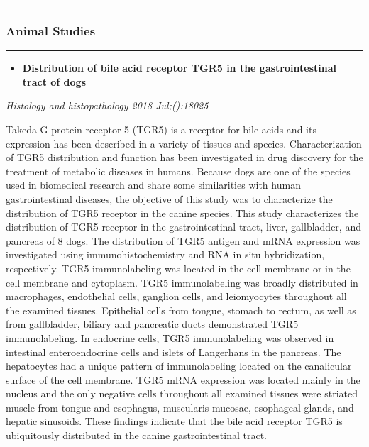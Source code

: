 \documentclass[]{article}
\providecommand{\tightlist}{%
  \setlength{\itemsep}{0pt}\setlength{\parskip}{0pt}}
\begin{document}
{}

{}

\begin{center}\rule{0.5\linewidth}{\linethickness}\end{center}

\hypertarget{animal-studies}{%
\subsubsection{Animal Studies}\label{animal-studies}}

\begin{center}\rule{0.5\linewidth}{\linethickness}\end{center}

\begin{itemize}
\tightlist
\item
  \textbf{Distribution of bile acid receptor TGR5 in the
  gastrointestinal tract of dogs}
\end{itemize}

\emph{Histology and histopathology 2018 Jul;():18025}

Takeda-G-protein-receptor-5 (TGR5) is a receptor for bile acids and its
expression has been described in a variety of tissues and species.
Characterization of TGR5 distribution and function has been investigated
in drug discovery for the treatment of metabolic diseases in humans.
Because dogs are one of the species used in biomedical research and
share some similarities with human gastrointestinal diseases, the
objective of this study was to characterize the distribution of TGR5
receptor in the canine species. This study characterizes the
distribution of TGR5 receptor in the gastrointestinal tract, liver,
gallbladder, and pancreas of 8 dogs. The distribution of TGR5 antigen
and mRNA expression was investigated using immunohistochemistry and RNA
in situ hybridization, respectively. TGR5 immunolabeling was located in
the cell membrane or in the cell membrane and cytoplasm. TGR5
immunolabeling was broadly distributed in macrophages, endothelial
cells, ganglion cells, and leiomyocytes throughout all the examined
tissues. Epithelial cells from tongue, stomach to rectum, as well as
from gallbladder, biliary and pancreatic ducts demonstrated TGR5
immunolabeling. In endocrine cells, TGR5 immunolabeling was observed in
intestinal enteroendocrine cells and islets of Langerhans in the
pancreas. The hepatocytes had a unique pattern of immunolabeling located
on the canalicular surface of the cell membrane. TGR5 mRNA expression
was located mainly in the nucleus and the only negative cells throughout
all examined tissues were striated muscle from tongue and esophagus,
muscularis mucosae, esophageal glands, and hepatic sinusoids. These
findings indicate that the bile acid receptor TGR5 is ubiquitously
distributed in the canine gastrointestinal tract.
\end{document}
